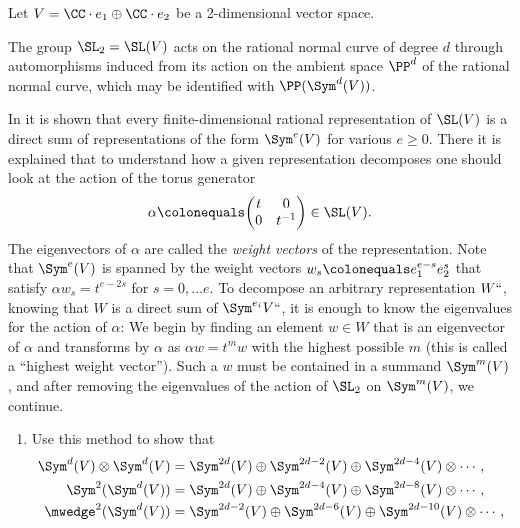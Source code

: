 \begin{exercise}\label{rnc and representations}
Let $V = \CC\cdot e_1\oplus \CC\cdot e_2$ be a 2-dimensional vector space.

The group $\SL_2= \SL (V)$ acts on the
rational normal curve
%
of degree $d$ through automorphisms induced from its action on
%
%
the ambient space $\PP^d$ of the rational normal curve, which may be identified with $\PP(\Sym^d(V))$.

In \cite[pp.\,146--150]{Fulton-Harris} it is shown that
 every finite-dimen\-sional rational
representation of $\SL(V)$ is a direct sum of representations of the
form $\Sym^e(V)$ for various $e\geq 0$.
There it is explained that to understand how a given representation decomposes one should look at the action of the
torus generator
%
$$
\alpha \colonequals \biggl(\begin{matrix}
t&0\\
0&t^{-1}
\end{matrix}
\biggr)
\in \SL(V).
$$
The eigenvectors of $\alpha$ are called the {\it weight vectors} of the representation.
%
Note that $\Sym^e(V)$ is spanned by the weight vectors
$w_s \colonequals e_1^{e-s} e_2^{s}$
that satisfy $\alpha w_s = t^{e-2s}$ for $s = 0, \dots e$.
To decompose an arbitrary representation $W` `$, knowing that $W$ is a direct sum of $\Sym^{e_i}V` `$, it is enough to know the
%
eigenvalues for the action of $\alpha$: We begin by finding an element $w\in W$ that
is an eigenvector of $\alpha$ and transforms by $\alpha$ as $\alpha w
= t^mw$ with the highest possible $m$ (this is called a ``highest
weight vector'').
Such a $w$
must be contained
in a summand $\Sym^m(V)$, and after removing the eigenvalues of the action of $\SL_2$ on $\Sym^m(V)$, we continue.
\begin{enumerate}
 \item Use this method to show that
%
\begin{align*}
 \Sym^d(V)\otimes \Sym^d(V)&= \Sym^{2d}(V) \oplus  \Sym^{2d-2}(V) \oplus \Sym^{2d-4}(V) \otimes\cdots,\\
 \Sym^2(\Sym^d(V))&= \Sym^{2d}(V) \oplus \Sym^{2d-4}(V)\oplus \Sym^{2d-8}(V)\otimes \cdots,\\[-1.5pt]
 \mwedge^2(\Sym^d(V))&= \Sym^{2d-2}(V) \oplus \Sym^{2d-6}(V)\oplus \Sym^{2d-10}(V)\otimes \cdots,

\end{align*}
\end{enumerate}
\end{exercise}
